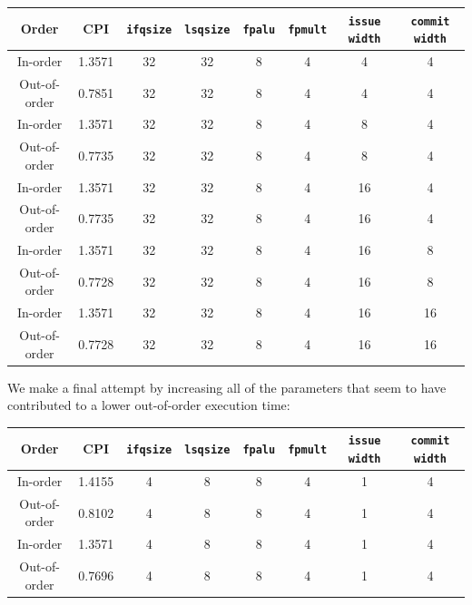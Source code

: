 \documentclass[twocolumn]{article}
\newcommand{\cc}[1]{\texttt{#1}}
\begin{document}
\begingroup
    \medskip
    \centering
    \def\arraystretch{1.5}
        \begin{tabular}{cccccccc}
            \toprule
            Order & CPI & \cc{ifqsize} & \cc{lsqsize} & \cc{fpalu} & \cc{fpmult} & \cc{issue width} & \cc{commit width}\\
            \midrule
            In-order & 1.3571 & 32 & 32 & 8 & 4 & 4 & 4\\
            Out-of-order & 0.7851 & 32 & 32 & 8 & 4 & 4 & 4\\
            \midrule
            In-order & 1.3571 & 32 & 32 & 8 & 4 & 8 & 4\\
            Out-of-order & 0.7735 & 32 & 32 & 8 & 4 & 8 & 4\\
            \midrule
            In-order & 1.3571 & 32 & 32 & 8 & 4 & 16 & 4\\
            Out-of-order & 0.7735 & 32 & 32 & 8 & 4 & 16 & 4\\
            \midrule
            In-order & 1.3571 & 32 & 32 & 8 & 4 & 16 & 8\\
            Out-of-order & 0.7728 & 32 & 32 & 8 & 4 & 16 & 8\\
            \bottomrule
            In-order & 1.3571 & 32 & 32 & 8 & 4 & 16 & 16\\
            Out-of-order & 0.7728 & 32 & 32 & 8 & 4 & 16 & 16\\
            \bottomrule
        \end{tabular}
    \label{table:btb}
\endgroup

We make a final attempt by increasing all of the parameters that seem to have contributed to a lower out-of-order execution time:

\begingroup
    \medskip
    \centering
    \def\arraystretch{1.5}
        \begin{tabular}{cccccccc}
            \toprule
            Order & CPI & \cc{ifqsize} & \cc{lsqsize} & \cc{fpalu} & \cc{fpmult} & \cc{issue width} & \cc{commit width}\\
            \midrule
            In-order & 1.4155 & 4 & 8 & 8 & 4 & 1 & 4\\
            Out-of-order & 0.8102 & 4 & 8 & 8 & 4 & 1 & 4\\
            \midrule
            In-order & 1.3571 & 4 & 8 & 8 & 4 & 1 & 4\\
            Out-of-order & 0.7696 & 4 & 8 & 8 & 4 & 1 & 4\\
            \bottomrule
        \end{tabular}
    \label{table:btb}
\endgroup
\end{document}
